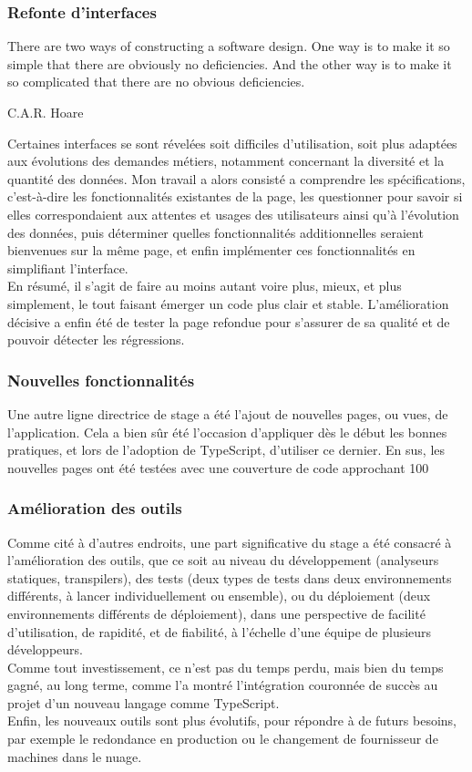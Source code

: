 \documentclass[a4paper,french,12pt]{article}
\begin{document}
		\subsubsection{Refonte d'interfaces}
		\epigraph{There are two ways of constructing a software design.  One way is to make it so simple that there are obviously no deficiencies. And the other way is to make it so complicated that there are no obvious deficiencies.}{C.A.R. Hoare}
		
		Certaines interfaces se sont révelées soit difficiles d'utilisation, soit plus adaptées aux évolutions des demandes métiers, notamment concernant la diversité et la quantité des données. Mon travail a alors consisté a comprendre les spécifications, c'est-à-dire les fonctionnalités existantes de la page, les questionner pour savoir si elles correspondaient aux attentes et usages des utilisateurs ainsi qu'à l'évolution des données, puis déterminer quelles fonctionnalités additionnelles seraient bienvenues sur la même page,  et enfin implémenter ces fonctionnalités en simplifiant l'interface. ~\\
		En résumé, il s'agit de faire au moins autant voire plus, mieux, et plus simplement, le tout faisant émerger un code plus clair et stable.
		L'amélioration décisive a enfin été de tester la page refondue pour s'assurer de sa qualité et de pouvoir détecter les régressions.
		
		\subsubsection{Nouvelles fonctionnalités}
		
		Une autre ligne directrice de stage a été l'ajout de nouvelles pages, ou vues, de l'application. Cela a bien sûr été l'occasion d'appliquer dès le début les bonnes pratiques, et lors de l'adoption de TypeScript, d'utiliser ce dernier.
		En sus, les nouvelles pages ont été testées avec une couverture de code approchant 100%
		
		\subsubsection{Amélioration des outils}

		Comme cité à d'autres endroits, une part significative du stage a été consacré à l'amélioration des outils, que ce soit au niveau du développement (analyseurs statiques, transpilers), des tests (deux types de tests dans deux environnements différents, à lancer individuellement ou ensemble), ou du déploiement (deux environnements différents de déploiement), dans une perspective de facilité d'utilisation, de rapidité, et de fiabilité, à l'échelle d'une équipe de plusieurs développeurs.~\\	
Comme tout investissement, ce n'est pas du temps perdu, mais bien du temps gagné, au long terme, comme l'a montré l'intégration couronnée de succès au projet d'un nouveau langage comme TypeScript.~\\
		Enfin, les nouveaux outils sont plus évolutifs, pour répondre à de futurs besoins, par exemple le redondance en production ou le changement de fournisseur de machines dans le nuage.
\end{document}
